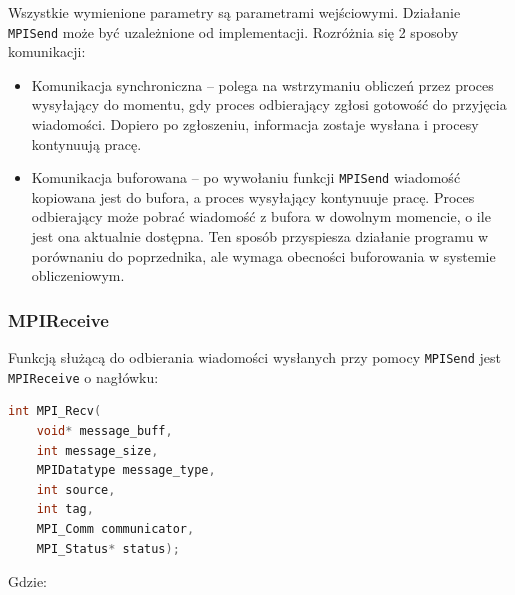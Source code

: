 Wszystkie wymienione parametry są parametrami wejściowymi. Działanie \texttt{MPI\textunderscore Send} może być uzależnione od implementacji. Rozróżnia się 2 sposoby komunikacji:

\begin{itemize}
	\item Komunikacja synchroniczna -- polega na wstrzymaniu obliczeń przez proces wysyłający do momentu, gdy proces odbierający zgłosi gotowość do przyjęcia wiadomości. Dopiero po zgłoszeniu, informacja zostaje wysłana i procesy kontynuują pracę.
	\item Komunikacja buforowana -- po wywołaniu funkcji \texttt{MPI\textunderscore Send} wiadomość kopiowana jest do bufora, a proces wysyłający kontynuuje pracę. Proces odbierający może pobrać wiadomość z bufora w dowolnym momencie, o ile jest ona aktualnie dostępna. Ten sposób przyspiesza działanie programu w porównaniu do poprzednika, ale wymaga obecności buforowania w systemie obliczeniowym.
\end{itemize}

\subsubsection{MPI\textunderscore Receive}
Funkcją służącą do odbierania wiadomości wysłanych przy pomocy \texttt{MPI\textunderscore Send} jest \texttt{MPI\textunderscore Receive} o nagłówku:
\begin{lstlisting}[language=C]
int MPI_Recv(
	void* message_buff,
	int message_size,
	MPIDatatype message_type,
	int source,
	int tag,
	MPI_Comm communicator,
	MPI_Status* status);
\end{lstlisting}

Gdzie:

